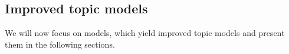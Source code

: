 \documentclass[
        a4paper,
        titlepage,
        twoside,
        parskip,
        numbers=noenddot
        ]{scrbook}
\makeatletter
\newcommand{\cmark}{\ding{51}}
\newcommand{\specialcell}[2][c]{%
   \begin{tabular}[#1]{@{}c@{}}#2\end{tabular}}
\theoremstyle{break}
\makeatother
\begin{document}

\subsection{Improved topic models}

We will now focus on models, which yield improved topic models and present them in the following sections.
\end{document}
